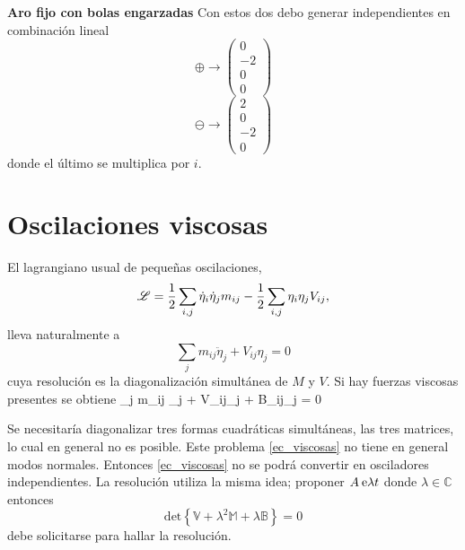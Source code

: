 \documentclass[10pt,oneside]{CBFT_book}
\begin{document}
\begin{ejemplo}{\bf Aro fijo con bolas engarzadas}
Con estos dos debo generar independientes en combinación lineal
\[
	\oplus \to  \begin{pmatrix}
	 0 \\
	 -2 \\
	 0 \\
	 0
	\end{pmatrix}
\]
\[
	\ominus \to \begin{pmatrix}
	 2 \\
	 0 \\
	 -2 \\
	 0
	\end{pmatrix}
\]
donde el último se multiplica por $i$.

\end{ejemplo}




\section{Oscilaciones viscosas}

El lagrangiano usual de pequeñas oscilaciones,
\[
	\mathscr{L} = \frac 1 2 \sum_{i,j} \dot{\eta}_i\dot{\eta}_j m_{ij} -  \frac 1 2 \sum_{i,j} {\eta}_i {\eta}_j V_{ij},
\]
lleva naturalmente a 
\[
	\sum_j m_{ij} \ddot{\eta}_j + V_{ij} \eta_j = 0
\]
cuya resolución es la diagonalización simultánea de $M$ y $V$.
Si hay fuerzas viscosas presentes se obtiene
\be
	\sum_j m_{ij} \ddot{\eta}_j + V_{ij}\eta_j + B_{ij}\dot{\eta}_j = 0
	\label{ec_viscosas}
\ee

Se necesitaría diagonalizar tres formas cuadráticas simultáneas, las tres matrices, lo cual
en general no es posible.
Este problema \eqref{ec_viscosas} no tiene en general modos normales. Entonces \eqref{ec_viscosas}
no se podrá convertir en osciladores independientes.
La resolución utiliza la misma idea; proponer $A\:\mathrm{e}{\lambda t}$ donde $\lambda \in \mathbb{C}$
entonces
\[
	\mbox{det}\left\{ \mathbb{V} + \lambda^2 \mathbb{M} + \lambda \mathbb{B}\right\} = 0
\]
debe solicitarse para hallar la resolución.
\end{document}
